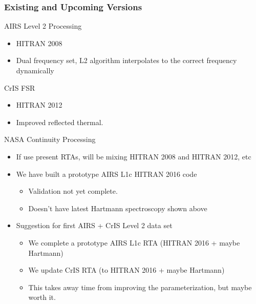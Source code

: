 \documentclass[10pt,t]{beamer}
\begin{document}
\begin{frame}[shrink=20]
  \frametitle{Existing and Upcoming Versions}

  \begin{block}{AIRS Level 2 Processing}
    \begin{itemize}
    \item HITRAN 2008
    \item Dual frequency set, L2 algorithm interpolates to the correct frequency  dynamically 
     \end{itemize}
  \end{block}
  \begin{block}{CrIS FSR}
    \begin{itemize}
    \item HITRAN 2012
    \item Improved reflected thermal.
     \end{itemize}
  \end{block}
  \begin{block}{NASA Continuity Processing}
    \begin{itemize}
    \item If use present RTAs, will be mixing HITRAN 2008 and HITRAN 2012, etc
    \item We have built a prototype AIRS L1c HITRAN 2016 code
      \begin{itemize}
      \item Validation not yet complete.
      \item Doesn't have latest Hartmann spectroscopy shown above
      \end{itemize}
    \item Suggestion for first AIRS + CrIS Level 2 data set
      \begin{itemize}
      \item We complete a prototype AIRS L1c RTA (HITRAN 2016 + maybe Hartmann)
      \item We update CrIS RTA (to HITRAN 2016 + maybe Hartmann)
      \item This takes away time from improving the parameterization, but maybe worth it.
      \end{itemize}
  
      

    \end{itemize}
  \end{block}
\end{frame}
\end{document}

